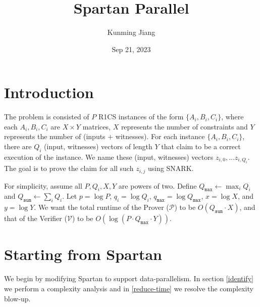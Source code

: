 \documentclass{article}
\title{Spartan Parallel}
\author{Kunming Jiang}
\date{Sep 21, 2023}
\newcommand{\Qsum}{Q_{\mathtt{sum}}}
\newcommand{\Qmax}{Q_{\mathtt{max}}}
\newcommand{\qmax}{q_{\mathtt{max}}}
\renewcommand{\P}{\mathcal{P}}
\newcommand{\V}{\mathcal{V}}
\begin{document}
\maketitle

\section{Introduction}\label{intro}

The problem is consisted of $P$ R1CS instances of the form $\{A_i, B_i, C_i\}$, where each $A_i, B_i, C_i$ are $X \times Y$ matrices, $X$ represents the number of constraints and $Y$ represents the number of (inputs + witnesses). For each instance $\{A_i, B_i, C_i\}$, there are $Q_i$ (input, witnesses) vectors of length $Y$ that claim to be a correct execution of the instance. We name these (input, witnesses) vectors $z_{i, 0},\dots z_{i, Q_i}$. The goal is to prove the claim for all such $z_{i, j}$ using SNARK.

For simplicity, assume all $P, Q_i, X, Y$ are powers of two. Define $\Qmax \leftarrow \max_i Q_i$ and $\Qsum \leftarrow \sum_i Q_i$. Let $p = \log P$, $q_i = \log Q_i$, $\qmax = \log \Qmax$, $x = \log X$, and $y = \log Y$. We want the total runtime of the Prover ($\P$) to be $O(\Qsum \cdot X)$, and that of the Verifier ($\V$) to be $O(\log(P \cdot \Qmax \cdot Y))$.

\section{Starting from Spartan}\label{spartan}
We begin by modifying Spartan to support data-parallelism. In section \ref{identify} we perform a complexity analysis and in \ref{reduce-time} we resolve the complexity blow-up.
\end{document}
